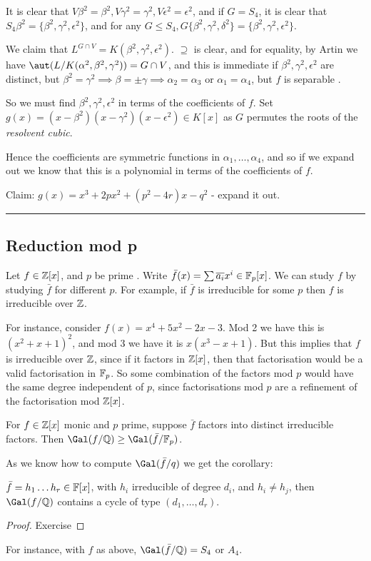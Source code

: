 \documentclass[a4paper, 10pt, twocolumn]{amsart}
\begin{document}
It is clear that $V\beta^2 = \beta^2, V\gamma^2=\gamma^2, V \epsilon^2 = \epsilon^2$, and if $G = S_4$, it is clear that $S_4 \beta^2 = \{\beta^2, \gamma^2, \epsilon^2\}$, and for any $G \leq S_4, G \{\beta^2, \gamma^2, \delta^2\} = \{\beta^2, \gamma^2, \epsilon^2\}$.

We claim that $L^{G \cap V} = K(\beta^2, \gamma^2, \epsilon^2)$. $\supseteq$ is clear, and for equality, by Artin we have $\aut(L/K(\alpha^2, \beta^2, \gamma^2)) = G \cap V$, and this is immediate if $\beta^2, \gamma^2, \epsilon^2$ are distinct, but $\beta^2 = \gamma^2 \implies \beta =\pm \gamma \implies \alpha_2=\alpha_3$ or $\alpha_1=\alpha_4$, but $f$ is separable \contr.

So we must find $\beta^2, \gamma^2, \epsilon^2$ in terms of the coefficients of $f$. Set $g(x) = (x-\beta^2)(x-\gamma^2)(x-\epsilon^2) \in K[x]$ as $G$ permutes the roots of the \emph{resolvent cubic}.

Hence the coefficients are symmetric functions in $\alpha_1, \ldots, \alpha_4$, and so if we expand out we know that this is a polynomial in terms of the coefficients of $f$.

Claim: $g(x) = x^3 + 2px^2 + (p^2-4r)x - q^2$ - expand it out. 
\hrule

\subsection*{Reduction mod p}
Let $f \in \mathbb{Z}[x]$, and $p$ be prime . Write $\bar{f}(x) = \sum \overline{a_i} x^i \in \mathbb{F}_p[x]$. We can study $f$ by studying $\bar{f}$ for different $p$. For example, if $\bar{f}$ is irreducible for some $p$ then $f$ is irreducible over $\mathbb{Z}$.

For instance, consider $f(x) = x^4+5x^2-2x-3$. Mod 2 we have this is $(x^2+x+1)^2$, and mod 3 we have it is $x(x^3-x+1)$. But this implies that $f$ is irreducible over $\mathbb{Z}$, since if it factors in $\mathbb{Z}[x]$, then that factorisation would be a valid factorisation in $\mathbb{F}_p$. So some combination of the factors mod $p$ would have the same degree independent of $p$, since factorisations mod $p$ are a refinement of the factorisation mod $\mathbb{Z}[x]$.

\begin{theorem}[Dedekind]
For $f \in \mathbb{Z}[x]$ monic and $p$ prime, suppose $\bar{f}$ factors into distinct irreducible factors. Then $\Gal(f/\Q) \geq \Gal(\bar{f}/\F_p)$.
\end{theorem}
As we know how to compute $\Gal(\bar{f}/q)$ we get the corollary:
\begin{corollary}
$\bar{f} = h_1\ldots h_r \in \mathbb{F}[x]$, with $h_i$ irreducible of degree $d_i$, and $h_i \neq h_j$, then $\Gal(f/\Q)$ contains a cycle of type $(d_1, \ldots, d_r)$.
\end{corollary}
\begin{proof}
Exercise
\end{proof}
For instance, with $f$ as above, $\Gal(\bar{f}/\Q) = S_4$ or $A_4$.
\end{document}
